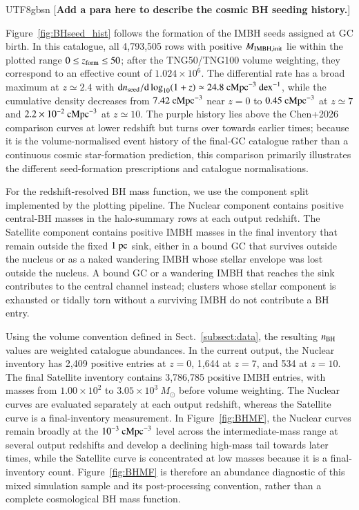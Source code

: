 \documentclass[trackchanges, twocolappendix, twocolumn]{aastex701}
\newcommand{\czkong}[1]{{\color{magenta}[\textbf{#1}]}}
\begin{document}
\begin{CJK*}{UTF8}{gbsn}
\czkong{Add a para here to describe the cosmic BH seeding history.}

Figure~\ref{fig:BHseed_hist} follows the formation of the IMBH seeds assigned at GC birth. In this catalogue, all 4,793,505 rows with positive $M_{\rm IMBH,init}$ lie within the plotted range $0\leq z_{\rm form}\leq50$; after the TNG50/TNG100 volume weighting, they correspond to an effective count of $1.024\times10^6$. The differential rate has a broad maximum at $z\simeq2.4$ with $\mathrm{d}n_{\rm seed}/\mathrm{d}\log_{10}(1+z)\simeq24.8~{\rm cMpc}^{-3}~{\rm dex}^{-1}$, while the cumulative density decreases from $7.42~{\rm cMpc}^{-3}$ near $z=0$ to $0.45~{\rm cMpc}^{-3}$ at $z\simeq7$ and $2.2\times10^{-2}~{\rm cMpc}^{-3}$ at $z\simeq10$. The purple history lies above the Chen+2026 comparison curves at lower redshift but turns over towards earlier times; because it is the volume-normalised event history of the final-GC catalogue rather than a continuous cosmic star-formation prediction, this comparison primarily illustrates the different seed-formation prescriptions and catalogue normalisations.

For the redshift-resolved BH mass function, we use the component split implemented by the plotting pipeline. The Nuclear component contains positive central-BH masses in the halo-summary rows at each output redshift. The Satellite component contains positive IMBH masses in the final inventory that remain outside the fixed $1~{\rm pc}$ sink, either in a bound GC that survives outside the nucleus or as a naked wandering IMBH whose stellar envelope was lost outside the nucleus. A bound GC or a wandering IMBH that reaches the sink contributes to the central channel instead; clusters whose stellar component is exhausted or tidally torn without a surviving IMBH do not contribute a BH entry.

Using the volume convention defined in Sect.~\ref{subsect:data}, the resulting $n_{\rm BH}$ values are weighted catalogue abundances. In the current output, the Nuclear inventory has 2,409 positive entries at $z=0$, 1,644 at $z=7$, and 534 at $z=10$. The final Satellite inventory contains 3,786,785 positive IMBH entries, with masses from $1.00\times10^2$ to $3.05\times10^3~M_\odot$ before volume weighting. The Nuclear curves are evaluated separately at each output redshift, whereas the Satellite curve is a final-inventory measurement. In Figure~\ref{fig:BHMF}, the Nuclear curves remain broadly at the $10^{-3}~{\rm cMpc}^{-3}$ level across the intermediate-mass range at several output redshifts and develop a declining high-mass tail towards later times, while the Satellite curve is concentrated at low masses because it is a final-inventory count. Figure~\ref{fig:BHMF} is therefore an abundance diagnostic of this mixed simulation sample and its post-processing convention, rather than a complete cosmological BH mass function.


\end{CJK*}
\end{document}
